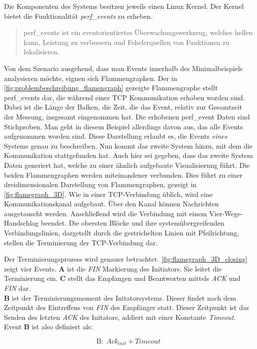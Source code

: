 Die Komponenten des Systems besitzen jeweils einen Linux Kernel. Der Kernel bietet die Funktionalität \emph{perf\_events} zu erheben. 
\begin{quote}
	perf\_events ist ein eventorientiertes Überwachungswerkzeug, welches helfen kann, Leistung zu verbessern und Fehelerquellen von Funktionen zu lokalisieren. 
\end{quote}
Von dem Szenario ausgehend, dass man Events innerhalb des Minimalbeispiels analysieren möchte, eignen sich Flammengraphen.
 Der in \cref{fig:problembeschreibung_flamengraph} gezeigte Flammengraphe stellt perf\_events dar, die während einer TCP Kommunikation erhoben worden sind.  Dabei ist die Länge der Balken, die Zeit, die das Event, relativ zur Gesamtzeit der Messung, insgesamt eingenommen hat. Die erhobenen perf\_event Daten sind Stichproben. Man geht in diesem Beispiel allerdings davon aus, das alle Events aufgenommen worden sind. Diese Darstellung erlaubt es, die Events \emph{eines} Systems genau zu beschreiben. Nun kommt das zweite System hinzu, mit dem die Kommunikation stattgefunden hat. Auch hier sei gegeben, dass das zweite System Daten generiert hat, welche zu einer ähnlich aufgebaute Visualisierung führt. Die beiden Flammengraphen werden miteinandener verbunden. Dies führt zu einer dreidimensionalen Darstellung von Flammengraphen, gezeigt in \cref{fig:flamegraph_3D}. Wie in einer TCP-Verbindung üblich, wird eine Kommunikationskanal aufgebaut. Über den Kanal können Nachrichten ausgetauscht werden. Anschließend wird die Verbindung mit einem Vier-Wege-Handschlag beendet. Die obersten Blöcke und ihre systemübergreifenden Verbindungslinien, dargetellt durch die gestrichelten Linien mit Pfeilrichtung, stellen die Terminierung der TCP-Verbindung dar.
 
 Der Terminierungsprozess wird genauer betrachtet. \cref{fig:flamegraph_3D_closing} zeigt vier Events. \textbf{A} ist die \emph{FIN} Markierung des Initiators. Sie leitet die Terminierung ein. \textbf{C} stellt das Empfangen und Beantworten mittels \emph{ACK} und \emph{FIN} dar. \\
 \textbf{B} ist der Terminierungsmoment des Initatorsystems. Dieser findet nach dem Zeitpunkt des Eintreffens von \emph{FIN} des Empfänger statt. Dieser Zeitpunkt ist das Senden des letzten \emph{ACK} des Initators, addiert mit einer Konstante \emph{Timeout}.  Event \textbf{B} ist also definiert als:
 
\[
	\text{B}: \; Ack_{init} + Timeout  
\]

